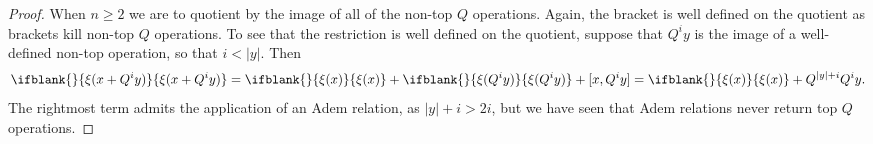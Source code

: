 \documentclass[11pt]{article}
\newcommand{\restn}[2][]{\ifblank{#1}{\xi{#2}}{\xi_{#1}{#2}}}%
\renewcommand{\Q}{Q}
\begin{document}
\begin{DiagramOfFunctors}
\begin{proof}
When $n\geq2$  we are to quotient by the image of all of the non-top $\Q$ operations. Again, the bracket is well defined on the quotient as brackets kill non-top $\Q$ operations. To see that the restriction is well defined on the quotient, %
suppose that $\Q^iy$ is the image of a well-defined non-top operation, so that $i<|y|$. Then
\[\restn{(x+\Q^iy)}=\restn{(x)}+\restn{(\Q^iy)}+[x,\Q^iy]=\restn{(x)}+\Q^{|y|+i}\Q^iy.\]
The rightmost term admits the application of an Adem relation, as $|y|+i>2i$, but we have seen that Adem relations never return top $\Q$ operations.


\end{proof}
\end{DiagramOfFunctors}
\end{document}
